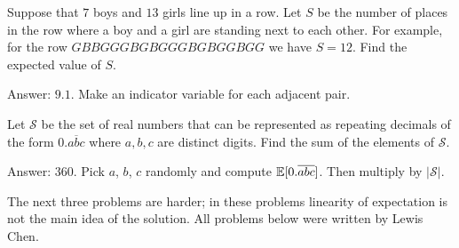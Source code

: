 \documentclass[11pt]{scrartcl}
\newcommand\EE{\mathbb E}
\begin{document}
\begin{problem}
	[AHSME 1989] Suppose that $7$ boys and $13$ girls line up in a row. Let $S$ be the number of places in the row where a boy and a girl are standing next to each other. For example, for the row $GBBGGGBGBGGGBGBGGBGG$ we have $S = 12$. Find the expected value of $S$.  %
	\begin{sketch}
		Answer: $9.1$. Make an indicator variable for each adjacent pair.
	\end{sketch}
\end{problem}
\begin{problem}
	[AIME 2006 \#6] Let $\mathcal{S}$ be the set of real numbers that can be represented as repeating decimals of the form $0.\overline{abc}$ where $a, b, c$ are distinct digits.  Find the sum of the elements of $\mathcal{S}$. %
	\begin{sketch}
		Answer: $360$. Pick $a$, $b$, $c$ randomly and compute $\EE[0.\ol{abc}]$. Then multiply by $\left\lvert \mathcal S \right\rvert$.
	\end{sketch}
\end{problem}

The next three problems are harder; in these problems linearity of expectation
is not the main idea of the solution.
All problems below were written by Lewis Chen.
\end{document}
